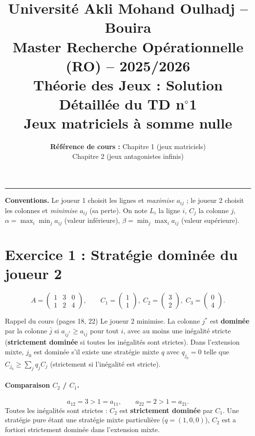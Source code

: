 \documentclass[11pt,a4paper]{article}
\title{\textbf{Université Akli Mohand Oulhadj -- Bouira}\\
\large Master Recherche Opérationnelle (RO) -- 2025/2026\\
\Large \textbf{Théorie des Jeux : Solution Détaillée du TD n$^\circ$1}\\
\large Jeux matriciels à somme nulle}
\author{\textbf{Référence de cours :} Chapitre 1 (jeux matriciels)\\ Chapitre 2 (jeux antagonistes infinis)}
\date{}
\begin{document}
\maketitle
\hrule
\vspace{0.4cm}

\textbf{Conventions.} Le joueur 1 choisit les lignes et \emph{maximise} $a_{ij}$ ; le joueur 2 choisit les colonnes et \emph{minimise} $a_{ij}$ (sa perte). On note $L_i$ la ligne $i$, $C_j$ la colonne $j$, $\alpha=\max_i\min_j a_{ij}$ (valeur inférieure), $\beta=\min_j\max_i a_{ij}$ (valeur supérieure).

\section*{Exercice 1 : Stratégie dominée du joueur 2}

\[
A=\begin{pmatrix} 1 & 3 & 0\\ 1 & 2 & 4\end{pmatrix}, \qquad C_1=\begin{pmatrix}1\\1\end{pmatrix},\; C_2=\begin{pmatrix}3\\2\end{pmatrix},\; C_3=\begin{pmatrix}0\\4\end{pmatrix}.
\]

\begin{propbox}{Rappel du cours (pages 18, 22)}
Le joueur 2 minimise. La colonne $j^*$ est \textbf{dominée} par la colonne $\bar{j}$ si $a_{ij^*}\ge a_{i\bar{j}}$ pour tout $i$, avec au moins une inégalité stricte (\textbf{strictement dominée} si toutes les inégalités sont strictes). Dans l'extension mixte, $j_0$ est dominée s'il existe une stratégie mixte $q$ avec $q_{j_0}=0$ telle que $C_{j_0}\ge \sum_j q_j C_j$ (strictement si l'inégalité est stricte).
\end{propbox}

\paragraph{Comparaison $C_2$ / $C_1$.}
\[
a_{12}=3>1=a_{11},\qquad a_{22}=2>1=a_{21}.
\]
Toutes les inégalités sont strictes : $C_2$ est \textbf{strictement dominée} par $C_1$. Une stratégie pure étant une stratégie mixte particulière ($q=(1,0,0)$), $C_2$ est a fortiori strictement dominée dans l'extension mixte.
\end{document}
